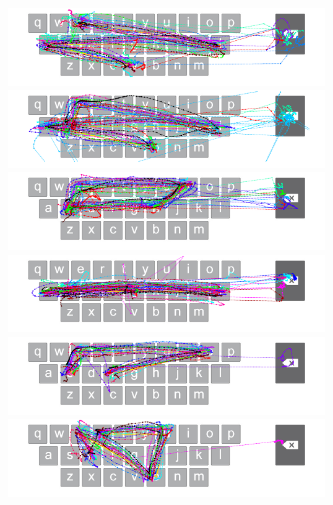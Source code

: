 \begin{figure}[t]
	\begin{minipage}[t]{8in}
	\hspace{-20pt}
	\begin{minipage}[t]{3.1in}
		\includegraphics[width=3.3in]{Figures/fig_vale_paths}
	\end{minipage}
	\begin{minipage}[t]{3in}
		\includegraphics[width=3.3in]{Figures/fig_bales_paths}
	\end{minipage}
	\end{minipage}
	
	\begin{minipage}[t]{8in}
	\hspace{-20pt}
	\begin{minipage}[t]{3.1in}
		\includegraphics[width=3.3in]{Figures/fig_shies_paths}
	\end{minipage}
	\begin{minipage}[t]{3in}
		\includegraphics[width=3.3in]{Figures/fig_galls_paths}
	\end{minipage}
	\end{minipage}
	
	\begin{minipage}[t]{8in}
	\hspace{-20pt}
	\begin{minipage}[t]{3.1in}
		\includegraphics[width=3.3in]{Figures/fig_fores_paths}
	\end{minipage}
	\begin{minipage}[t]{3in}
		\includegraphics[width=3.3in]{Figures/fig_rubbed_paths}
	\end{minipage}
	\end{minipage}
	

\end{figure}
